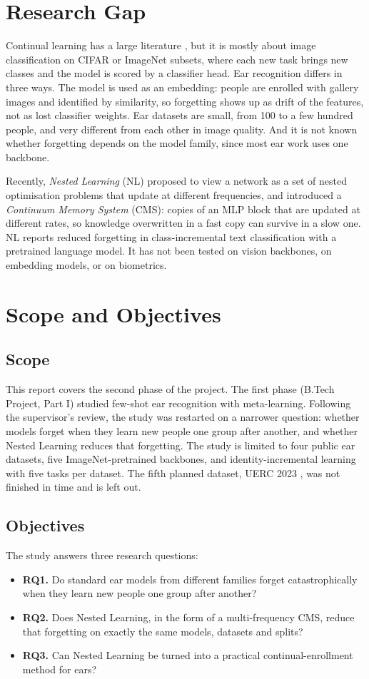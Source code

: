 \documentclass[12pt,a4paper]{report}
\begin{document}
\section{Research Gap}
Continual learning has a large literature \cite{delange2021survey}, but it is mostly about image classification on CIFAR or ImageNet subsets, where each new task brings new classes and the model is scored by a classifier head. Ear recognition differs in three ways. The model is used as an embedding: people are enrolled with gallery images and identified by similarity, so forgetting shows up as drift of the features, not as lost classifier weights. Ear datasets are small, from 100 to a few hundred people, and very different from each other in image quality. And it is not known whether forgetting depends on the model family, since most ear work uses one backbone.

Recently, \emph{Nested Learning} (NL) \cite{behrouz2025nested} proposed to view a network as a set of nested optimisation problems that update at different frequencies, and introduced a \emph{Continuum Memory System} (CMS): copies of an MLP block that are updated at different rates, so knowledge overwritten in a fast copy can survive in a slow one. NL reports reduced forgetting in class-incremental text classification with a pretrained language model. It has not been tested on vision backbones, on embedding models, or on biometrics.

\section{Scope and Objectives}
\subsection{Scope}
This report covers the second phase of the project. The first phase (B.Tech Project, Part I) studied few-shot ear recognition with meta-learning. Following the supervisor's review, the study was restarted on a narrower question: whether models forget when they learn new people one group after another, and whether Nested Learning reduces that forgetting. The study is limited to four public ear datasets, five ImageNet-pretrained backbones, and identity-incremental learning with five tasks per dataset. The fifth planned dataset, UERC 2023 \cite{emersic2023uerc}, was not finished in time and is left out.

\subsection{Objectives}
The study answers three research questions:
\begin{itemize}
\item \textbf{RQ1.} Do standard ear models from different families forget catastrophically when they learn new people one group after another?
\item \textbf{RQ2.} Does Nested Learning, in the form of a multi-frequency CMS, reduce that forgetting on exactly the same models, datasets and splits?
\item \textbf{RQ3.} Can Nested Learning be turned into a practical continual-enrollment method for ears?
\end{itemize}
\end{document}
